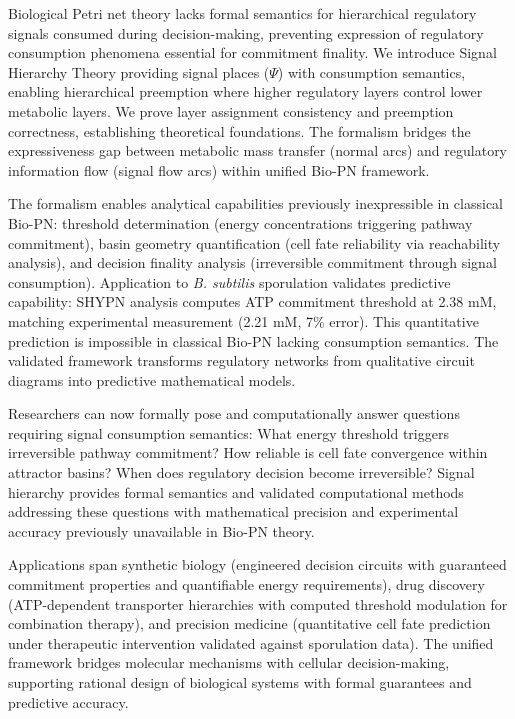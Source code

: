 \documentclass[twocolumn,11pt]{article}
\begin{document}
Biological Petri net theory lacks formal semantics for hierarchical regulatory signals consumed during decision-making, preventing expression of regulatory consumption phenomena essential for commitment finality. We introduce Signal Hierarchy Theory providing signal places ($\Psi$) with consumption semantics, enabling hierarchical preemption where higher regulatory layers control lower metabolic layers. We prove layer assignment consistency and preemption correctness, establishing theoretical foundations. The formalism bridges the expressiveness gap between metabolic mass transfer (normal arcs) and regulatory information flow (signal flow arcs) within unified Bio-PN framework.

\vspace{3pt}
\noindent The formalism enables analytical capabilities previously inexpressible in classical Bio-PN: threshold determination (energy concentrations triggering pathway commitment), basin geometry quantification (cell fate reliability via reachability analysis), and decision finality analysis (irreversible commitment through signal consumption). Application to \textit{B. subtilis} sporulation validates predictive capability: SHYPN analysis computes ATP commitment threshold at 2.38 mM, matching experimental measurement (2.21 mM, 7\% error). This quantitative prediction is impossible in classical Bio-PN lacking consumption semantics. The validated framework transforms regulatory networks from qualitative circuit diagrams into predictive mathematical models.

\vspace{3pt}
\noindent Researchers can now formally pose and computationally answer questions requiring signal consumption semantics: What energy threshold triggers irreversible pathway commitment? How reliable is cell fate convergence within attractor basins? When does regulatory decision become irreversible? Signal hierarchy provides formal semantics and validated computational methods addressing these questions with mathematical precision and experimental accuracy previously unavailable in Bio-PN theory.

\vspace{3pt}
\noindent Applications span synthetic biology (engineered decision circuits with guaranteed commitment properties and quantifiable energy requirements), drug discovery (ATP-dependent transporter hierarchies with computed threshold modulation for combination therapy), and precision medicine (quantitative cell fate prediction under therapeutic intervention validated against sporulation data). The unified framework bridges molecular mechanisms with cellular decision-making, supporting rational design of biological systems with formal guarantees and predictive accuracy.
\end{document}
